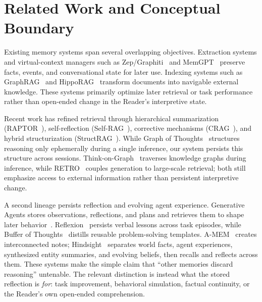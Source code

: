 \section{Related Work and Conceptual Boundary}\label{sec:reasoning-capture}

Existing memory systems span several overlapping objectives. Extraction systems and virtual-context managers such as Zep/Graphiti~\cite{rasmussen2025graphiti} and MemGPT~\cite{packer2023memgpt} preserve facts, events, and conversational state for later use. Indexing systems such as GraphRAG~\cite{edge2024graphrag} and HippoRAG~\cite{gutierrez2024hipporag} transform documents into navigable external knowledge. These systems primarily optimize later retrieval or task performance rather than open-ended change in the Reader's interpretive state.

Recent work has refined retrieval through hierarchical summarization (RAPTOR~\cite{sarthi2024raptor}), self-reflection (Self-RAG~\cite{asai2024selfrag}), corrective mechanisms (CRAG~\cite{yan2024crag}), and hybrid structurization (StructRAG~\cite{li2024structrag}). While Graph of Thoughts~\cite{besta2024got} structures reasoning only ephemerally during a single inference, our system persists this structure across sessions. Think-on-Graph~\cite{sun2024thinkongraph} traverses knowledge graphs during inference, while RETRO~\cite{borgeaud2022retro} couples generation to large-scale retrieval; both still emphasize access to external information rather than persistent interpretive change.

A second lineage persists reflection and evolving agent experience. Generative Agents stores observations, reflections, and plans and retrieves them to shape later behavior~\cite{park2023generative}. Reflexion~\cite{shinn2023reflexion} persists verbal lessons across task episodes, while Buffer of Thoughts~\cite{yang2024bot} distills reusable problem-solving templates. A-MEM~\cite{xu2025amem} creates interconnected notes; Hindsight~\cite{vectorize2025hindsight} separates world facts, agent experiences, synthesized entity summaries, and evolving beliefs, then recalls and reflects across them. These systems make the simple claim that ``other memories discard reasoning'' untenable. The relevant distinction is instead what the stored reflection is \emph{for}: task improvement, behavioral simulation, factual continuity, or the Reader's own open-ended comprehension.


